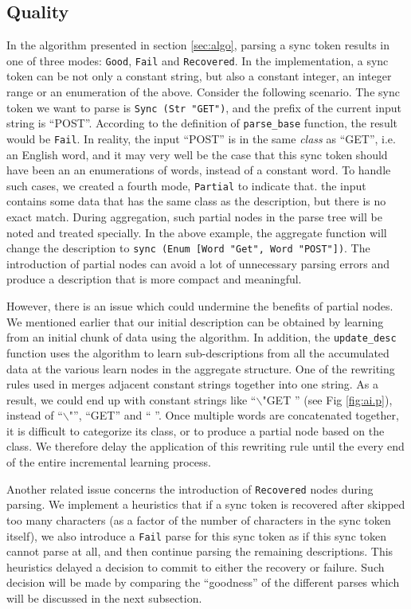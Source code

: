 \subsection{Quality}
In the algorithm presented in section \ref{sec:algo}, parsing a sync token results
in one of three modes: {\tt Good}, {\tt Fail} and {\tt Recovered}. 
In the implementation, a sync token can be not only a constant string, but also
a constant integer, an integer range or an enumeration of the above.
Consider the following scenario. 
The sync token we want to parse is {\tt Sync (Str "GET")},
and the prefix of the current input string is ``POST''. According to the
definition of {\tt parse\_base} function, the result would be {\tt Fail}.
In reality, the input ``POST'' is in the same {\em class} as ``GET'', 
i.e. an English word,
and it may very well be the case that this sync token should have been 
an an enumerations of words, instead of a constant word.
To handle such cases, we created a fourth mode, {\tt Partial} to indicate that. 
the input contains some data that has the same class as the description,
but there is no exact match. During aggregation, such partial nodes in the parse
tree will be noted and treated specially. In the above example, the aggregate 
function will change the description to {\tt sync (Enum [Word "Get", Word "POST"])}.
The introduction of partial nodes can avoid a lot of unnecessary parsing errors
and produce a description that is more compact and meaningful. 

However, there is an issue which could undermine the benefits of partial nodes.
We mentioned earlier that our initial description can be obtained by learning
from an initial chunk of data using the \learnpads{} algorithm. In addition,
the {\tt update\_desc} function uses the \learnpads{} algorithm to learn 
sub-descriptions from all the accumulated data at the various learn nodes 
in the aggregate structure. One of the rewriting rules used in \learnpads{}
merges adjacent constant strings together into one string. As a result, we
could end up with constant strings like ``$\backslash$"GET '' 
(see Fig \ref{fig:ai.p}), instead of ``$\backslash$"'', ``GET'' and `` ''. 
Once multiple words are
concatenated together, it is difficult to categorize its class, or to
produce a partial node based on the class. We therefore delay the application of
this rewriting rule until the every end of the entire incremental learning process.

Another related issue concerns the introduction of {\tt Recovered} nodes 
during parsing. We implement a heuristics that if a sync token is recovered
after skipped too many characters (as a factor of the number of characters in
the sync token itself), we also introduce a {\tt Fail} parse for this sync
token as if this sync token cannot parse at all, and then continue parsing the 
remaining descriptions. This heuristics delayed a decision to commit to
either the recovery or failure. Such decision will be made by comparing the 
``goodness'' of the different parses which will be discussed in the next
subsection.


